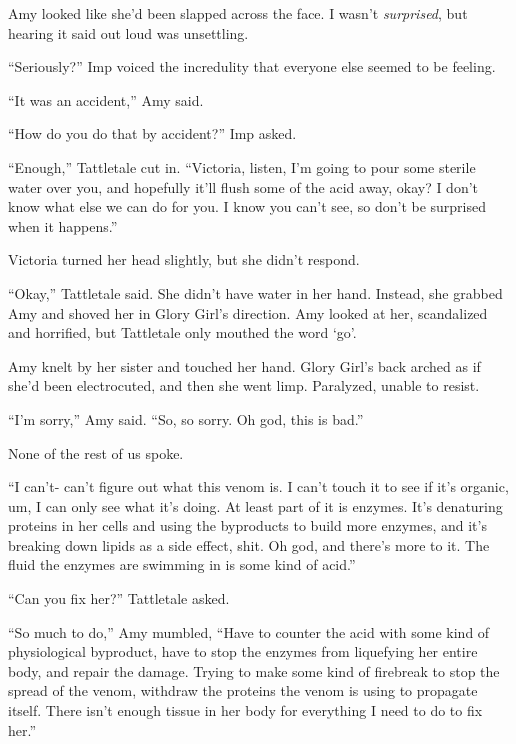 Amy looked like she'd been slapped across the face.  I wasn't \emph{surprised}, but hearing it said out loud was unsettling.



``Seriously?''  Imp voiced the incredulity that everyone else seemed to be feeling.



``It was an accident,'' Amy said.



``How do you do that by accident?''  Imp asked.



``Enough,'' Tattletale cut in.  ``Victoria, listen, I'm going to pour some sterile water over you, and hopefully it'll flush some of the acid away, okay?  I don't know what else we can do for you.  I know you can't see, so don't be surprised when it happens.''



Victoria turned her head slightly, but she didn't respond.



``Okay,'' Tattletale said.  She didn't have water in her hand.  Instead, she grabbed Amy and shoved her in Glory Girl's direction.  Amy looked at her, scandalized and horrified, but Tattletale only mouthed the word `go'.



Amy knelt by her sister and touched her hand.  Glory Girl's back arched as if she'd been electrocuted, and then she went limp.  Paralyzed, unable to resist.



``I'm sorry,'' Amy said.  ``So, so sorry.  Oh god, this is bad.''



None of the rest of us spoke.



``I can't- can't figure out what this venom is.  I can't touch it to see if it's organic, um, I can only see what it's doing.  At least part of it is enzymes.  It's denaturing proteins in her cells and using the byproducts to build more enzymes, and it's breaking down lipids as a side effect, shit.  Oh god, and there's more to it.  The fluid the enzymes are swimming in is some kind of acid.''



``Can you fix her?''  Tattletale asked.



``So much to do,'' Amy mumbled, ``Have to counter the acid with some kind of physiological byproduct, have to stop the enzymes from liquefying her entire body, and repair the damage.  Trying to make some kind of firebreak to stop the spread of the venom, withdraw the proteins the venom is using to propagate itself.  There isn't enough tissue in her body for everything I need to do to fix her.''



